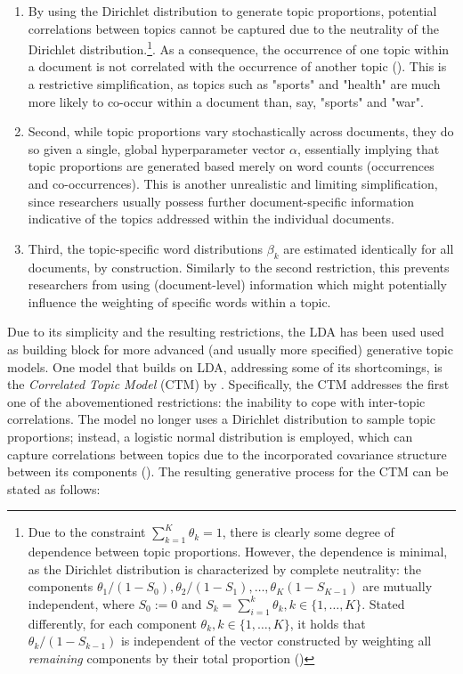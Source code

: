 \documentclass[12pt]{article}
\begin{document}
\begin{enumerate}[label=(\roman*)]
\vspace{-0.25cm}
\item By using the Dirichlet distribution to generate topic proportions, potential correlations between topics cannot be captured due to the neutrality of the Dirichlet distribution.\footnote{Due to the constraint $\sum_{k=1}^{K}\theta_{k}=1$, there is clearly some degree of dependence between topic proportions. However, the dependence is minimal, as the Dirichlet distribution is characterized by complete neutrality: the components $\theta_1/(1-S_0), \theta_2/(1-S_1),\dots, \theta_K(1-S_{K-1})$ are mutually independent, where $S_0:=0$ and $S_k = \sum_{i=1}^{k}\theta_k, k \in \{1,\dots,K\}$. Stated differently, for each component $\theta_k, k \in \{1,\dots,K\}$, it holds that $\theta_k/(1-S_{k-1})$ is independent of the vector constructed by weighting all \textit{remaining} components by their total proportion (\citealp{james1980new})}. As a consequence, the occurrence of one topic within a document is not correlated with the occurrence of another topic (\citealp{blei2007correlated}). This is a restrictive simplification, as topics such as "sports" and "health" are much more likely to co-occur within a document than, say, "sports" and "war".
\vspace{-0.25cm}
\item Second, while topic proportions vary stochastically across documents, they do so given a single, global hyperparameter vector $\alpha$, essentially implying that topic proportions are generated based merely on word counts (occurrences and co-occurrences). This is another unrealistic and limiting simplification, since researchers usually possess further document-specific information indicative of the topics addressed within the individual documents.
\vspace{-0.25cm}
\item Third, the topic-specific word distributions $\beta_k$ are estimated identically for all documents, by construction. Similarly to the second restriction, this prevents researchers from using (document-level) information which might potentially influence the weighting of specific words within a topic.

\end{enumerate}

\noindent
Due to its simplicity and the resulting restrictions, the LDA has been used used as building block for more advanced (and usually more specified) generative topic models. One model that builds on LDA, addressing some of its shortcomings, is the \textit{Correlated Topic Model} (CTM) by \cite{blei2007correlated}. Specifically, the CTM addresses the first one of the abovementioned restrictions: the inability to cope with inter-topic correlations. The model no longer uses a Dirichlet distribution to sample topic proportions; instead, a logistic normal distribution is employed, which can capture correlations between topics due to the incorporated covariance structure between its components (\citealp{atchison1980logistic}). The resulting generative process for the CTM can be stated as follows:
\end{document}
